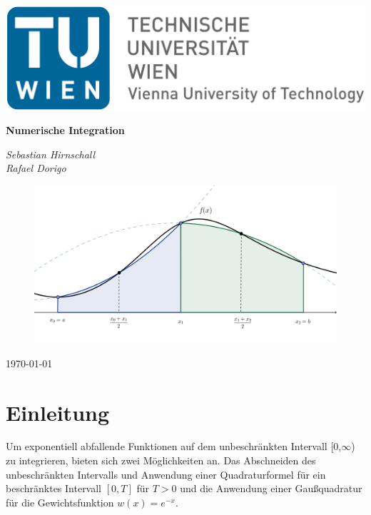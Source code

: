 \documentclass[12pt,a4paper]{scrartcl}
\author{Sebastian Hirnschall, Rafael Dorigo}
\date{\today}
\numberwithin{equation}{section}
\numberwithin{myalgctr}{section}
\numberwithin{mytheoremctr}{subsection}
\numberwithin{mykorollarctr}{subsection}
\numberwithin{mylemmactr}{subsection}
\numberwithin{mybeispielctr}{subsection}
\begin{document}
	\begin{titlepage}
		\begin{flushleft}
				\includegraphics[width=.4\linewidth]{tuwien.png}
		\end{flushleft}	
		\centering
		
		
		\vspace{5cm}
		{\huge\bfseries Numerische Integration\par}
		\vspace{2cm}
		{\Large\itshape Sebastian Hirnschall\\Rafael Dorigo\par}
		\vspace{2cm}
		\begin{figure}[!h]
			\vspace{0cm}
			\centering
			\includegraphics[width=.6\linewidth]{./titlepage.png}
		\end{figure}
		
		\vfill
		
		{\large \today\par}
	\end{titlepage}
	\restoregeometry
	
	\thispagestyle{firststyle}
	
	\newpage
	
	
	\tableofcontents
	\thispagestyle{general}
	\newpage

	\section{Einleitung}
	Um exponentiell abfallende Funktionen auf dem unbeschränkten Intervall [0,$\infty$) zu integrieren, bieten sich zwei Möglichkeiten an. Das Abschneiden des unbeschränkten Intervalls und Anwendung einer Quadraturformel für ein beschränktes Intervall $[0,T]$ für $T > 0$ und die Anwendung einer Gaußquadratur für die Gewichtsfunktion $w(x) = e^{-x}$.
	
\end{document}
